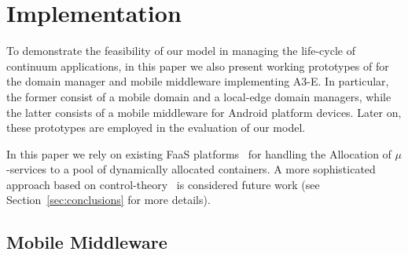 \section{Implementation}\label{sec:implementation}


To demonstrate the feasibility of our model
in managing the life-cycle of continuum applications, in this paper we also present working prototypes of for the domain manager and mobile middleware implementing A3-E. In particular, the former consist of a mobile domain and a local-edge domain managers, while the latter consists of a mobile middleware for Android platform devices. Later on, these prototypes are employed in the evaluation of our model.

In this paper we rely on existing FaaS platforms~\cite{AWSLambda, OpenWhisk} for handling the Allocation of $\mu$-services to a pool of dynamically allocated containers. A more sophisticated approach based on control-theory~\cite{Quatrocchi2016discrete} is considered future work (see Section~\ref{sec:conclusions} for more details).






\subsection{Mobile Middleware}~\label{sec:mobile_middleware}


